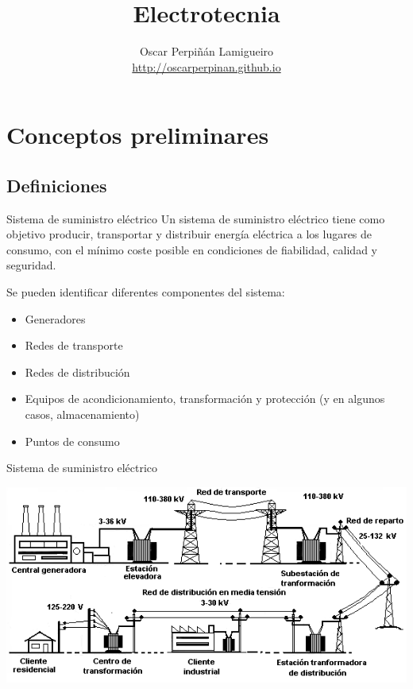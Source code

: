 \documentclass[xcolor={usenames,svgnames,dvipsnames}]{beamer}
\author{Oscar Perpiñán Lamigueiro \\ \url{http://oscarperpinan.github.io}}
\date{}
\title{Electrotecnia}
\begin{document}
\maketitle

\section{Conceptos preliminares}
\label{sec:orgcfd3182}
\subsection{Definiciones}
\label{sec:org134c22f}
\begin{frame}[label={sec:org7349db4}]{Sistema de suministro eléctrico}
Un \alert{sistema de suministro eléctrico} tiene como objetivo \alert{producir,
transportar y distribuir energía eléctrica} a los lugares de consumo,
con el mínimo coste posible en condiciones de \alert{fiabilidad, calidad y
seguridad}.

Se pueden identificar diferentes componentes del sistema:

\begin{itemize}
\item Generadores

\item Redes de transporte

\item Redes de distribución

\item Equipos de acondicionamiento, transformación y protección (y en
algunos casos, almacenamiento)

\item Puntos de consumo
\end{itemize}
\end{frame}

\begin{frame}[label={sec:org8a9a9a0}]{Sistema de suministro eléctrico}
\begin{center}
\includegraphics[width=.9\linewidth]{../figs/Redelectrica2.png}
\end{center}
\end{frame}
\end{document}
